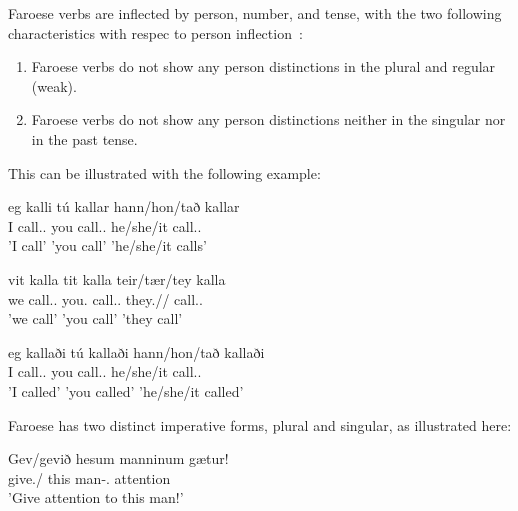 \documentclass[12pt,%
    times,
]{lin-v2/lin}
\begin{document}
Faroese verbs are inflected by person, number, and tense, with the two following characteristics with respec to
person inflection~\citep[67]{faroese}:
\begin{enumerate}
    \item Faroese verbs do not show any person distinctions in the plural and regular (weak).
    \item Faroese verbs do not show any person distinctions neither in the singular nor in the past tense.
\end{enumerate}

This can be illustrated with the following example:
\begin{exe}
    \ex
    \begin{xlist}
        \item \gll eg kalli tú kallar hann/hon/tað kallar\\
        I call.\First\Sg.\Prs{} you call.\Second\Sg.\Prs{} he/she/it call.\Third\Sg.\Prs\\
        \trans 'I call' 'you call' 'he/she/it calls'
        \item \gll vit kalla tit kalla teir/tær/tey kalla\\
        we call.\First\Pl.\Prs{} you.\Pl{} call.\Second\Pl.\Prs{} they.\M/\F/\N{} call.\Third\Pl.\Prs\\
        \trans 'we call' 'you call' 'they call'
        \item \gll eg kallaði tú kallaði hann/hon/tað kallaði\\
        I call.\First\Sg.\Pst{} you call.\Second\Sg.\Pst{} he/she/it call.\Third\Sg.\Pst\\
        \trans 'I called' 'you called' 'he/she/it called'
    \end{xlist}
\end{exe}

Faroese has two distinct imperative forms, plural and singular, as illustrated here:
\begin{exe}
    \ex
    \gll Gev/gevið hesum manninum gætur!\\
    give.\Sg/\Pl{} this man-\Det.\Third\Sg\Dat{} attention\\
    \trans 'Give attention to this man!'
\end{exe}
\end{document}
